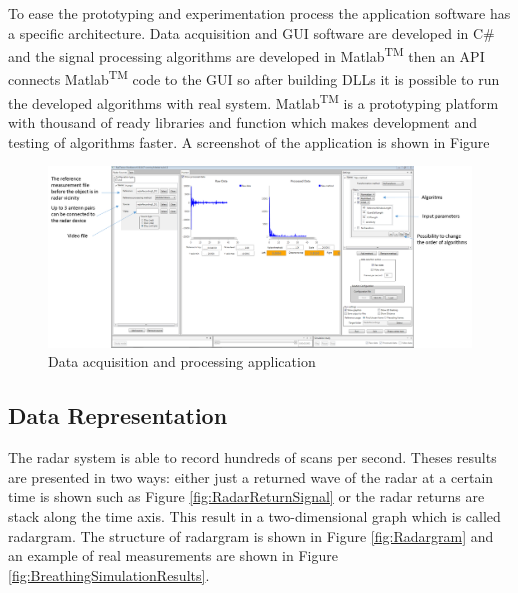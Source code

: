 To ease the prototyping and experimentation process the application software has a specific architecture. Data acquisition and GUI software are developed in C\# and the signal processing algorithms are developed in Matlab\textsuperscript{TM} then an API connects Matlab\textsuperscript{TM} code to the GUI so after building DLLs it is possible to run the developed algorithms with real system. Matlab\textsuperscript{TM} is a prototyping platform with thousand of ready libraries and function which makes development and testing of algorithms faster. A screenshot of the application is shown in Figure 
\begin{figure}
    \centering
    \includegraphics[width=20 cm,keepaspectratio]{Figures/RadTector.PNG}
    \caption{Data acquisition and processing application}
    \label{fig:RadTector}
\end{figure}
\subsection{Data Representation}
The radar system is able to record hundreds of scans per second. Theses results are presented in two ways: either just a returned wave of the radar at a certain time is shown such as Figure \ref{fig:RadarReturnSignal} or the radar returns are stack along the time axis. This result in a two-dimensional graph which is called radargram. The structure of radargram is shown in Figure \ref{fig:Radargram} and an example of real measurements are shown in Figure \ref{fig:BreathingSimulationResults}.

